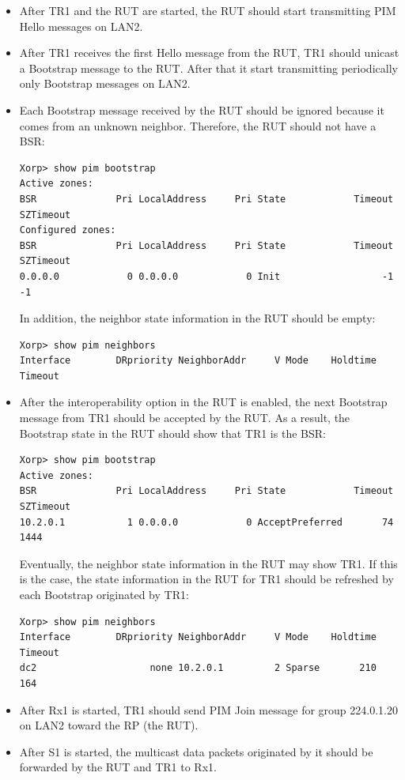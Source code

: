 \documentclass[11pt]{report}
\begin{document}
\begin{itemize}

  \item After TR1 and the RUT are started, the RUT should start transmitting
  PIM Hello messages on LAN2.

  \item After TR1 receives the first Hello message from the RUT, TR1 should
  unicast a Bootstrap message to the RUT. After that it start transmitting
  periodically only Bootstrap messages on LAN2.

  \item Each Bootstrap message received by the RUT should be ignored because
  it comes from an unknown neighbor. Therefore, the RUT should not have a
  BSR:

\begin{verbatim}
Xorp> show pim bootstrap
Active zones:
BSR              Pri LocalAddress     Pri State            Timeout SZTimeout
Configured zones:
BSR              Pri LocalAddress     Pri State            Timeout SZTimeout
0.0.0.0            0 0.0.0.0            0 Init                  -1        -1
\end{verbatim}

  In addition, the neighbor state information in the RUT should be empty:

\begin{verbatim}
Xorp> show pim neighbors 
Interface        DRpriority NeighborAddr     V Mode    Holdtime Timeout
\end{verbatim}


  \item After the interoperability option in the RUT is enabled, the next
  Bootstrap message from TR1 should be accepted by the RUT. As a result, the
  Bootstrap state in the RUT should show that TR1 is the BSR:

\begin{verbatim}
Xorp> show pim bootstrap
Active zones:
BSR              Pri LocalAddress     Pri State            Timeout SZTimeout
10.2.0.1           1 0.0.0.0            0 AcceptPreferred       74      1444
\end{verbatim}

  Eventually, the neighbor state information in the RUT may show TR1. If this
  is the case, the state information in the RUT for TR1 should be refreshed by
  each Bootstrap originated by TR1:

\begin{verbatim}
Xorp> show pim neighbors 
Interface        DRpriority NeighborAddr     V Mode    Holdtime Timeout
dc2                    none 10.2.0.1         2 Sparse       210     164
\end{verbatim}

  \item After Rx1 is started, TR1 should send PIM Join message for group
  224.0.1.20 on LAN2 toward the RP (the RUT).

  \item After S1 is started, the multicast data packets originated by it
  should be forwarded by the RUT and TR1 to Rx1.

\end{itemize}
\end{document}
